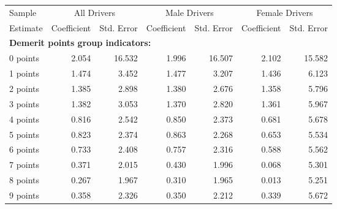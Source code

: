 
\begin{table}%
\centering 
\begin{tabular}{l r r r r r r} 

\hline 
 

Sample 
 & \multicolumn{2}{c}{All  Drivers}  & \multicolumn{2}{c}{Male  Drivers}  & \multicolumn{2}{c}{Female  Drivers}   \\ 
 

 \cmidrule(lr){1-1}\cmidrule(lr){2-3}\cmidrule(lr){4-5}\cmidrule(lr){6-7} 

Estimate  & Coefficient & Std. Error  & Coefficient & Std. Error  & Coefficient & Std. Error   \\ 
 

\hline 
 
\multicolumn{4}{l}{\textbf{Demerit points group indicators:}}  \\ 
 
0 points  &  2.054  & 16.532  &  1.996  & 16.507  &  2.102  & 15.582   \\ 
 
1 points  &  1.474  &  3.452  &  1.477  &  3.207  &  1.436  &  6.123   \\ 
 
2 points  &  1.385  &  2.898  &  1.380  &  2.676  &  1.358  &  5.796   \\ 
 
3 points  &  1.382  &  3.053  &  1.370  &  2.820  &  1.361  &  5.967   \\ 
 
4 points  &  0.816  &  2.542  &  0.850  &  2.373  &  0.681  &  5.678   \\ 
 
5 points  &  0.823  &  2.374  &  0.863  &  2.268  &  0.653  &  5.534   \\ 
 
6 points  &  0.733  &  2.408  &  0.757  &  2.316  &  0.588  &  5.562   \\ 
 
7 points  &  0.371  &  2.015  &  0.430  &  1.996  &  0.068  &  5.301   \\ 
 
8 points  &  0.267  &  1.967  &  0.310  &  1.965  &  0.013  &  5.251   \\ 
 
9 points  &  0.358  &  2.326  &  0.350  &  2.212  &  0.339  &  5.672   \\ 
 

\end{tabular}
\end{table}
